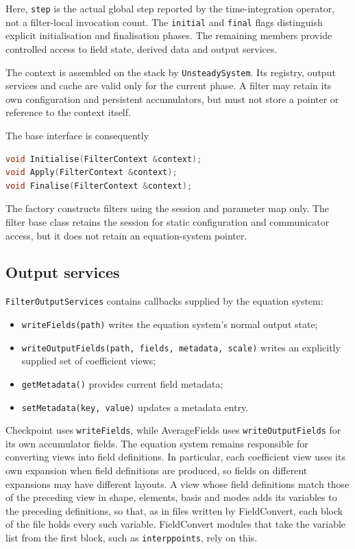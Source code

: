 Here, \texttt{step} is the actual global step reported by the time-integration
operator, not a filter-local invocation count. The \texttt{initial} and
\texttt{final} flags distinguish explicit initialisation and finalisation
phases. The remaining members provide controlled access to field state,
derived data and output services.

The context is assembled on the stack by \texttt{UnsteadySystem}. Its registry,
output services and cache are valid only for the current phase. A filter may
retain its own configuration and persistent accumulators, but must not store a
pointer or reference to the context itself.

The base interface is consequently

\begin{lstlisting}[language=C++]
void Initialise(FilterContext &context);
void Apply(FilterContext &context);
void Finalise(FilterContext &context);
\end{lstlisting}

The factory constructs filters using the session and parameter map only. The
filter base class retains the session for static configuration and communicator
access, but it does not retain an equation-system pointer.

\subsection{Output services}

\texttt{FilterOutputServices} contains callbacks supplied by the equation
system:

\begin{itemize}
\item \texttt{writeFields(path)} writes the equation system's normal output
      state;
\item \texttt{writeOutputFields(path, fields, metadata, scale)} writes an
      explicitly supplied set of coefficient views;
\item \texttt{getMetadata()} provides current field metadata;
\item \texttt{setMetadata(key, value)} updates a metadata entry.
\end{itemize}

Checkpoint uses \texttt{writeFields}, while AverageFields uses
\texttt{writeOutputFields} for its own accumulator fields. The
equation system remains responsible for converting views into field
definitions. In particular, each coefficient view uses its own expansion when
field definitions are produced, so fields on different expansions may have
different layouts. A
view whose field definitions match those of the preceding view in shape,
elements, basis and modes adds its variables to the preceding definitions, so
that, as in files written by FieldConvert, each block of the file holds every
such variable. FieldConvert modules that take the variable list from the first
block, such as \texttt{interppoints}, rely on this.


